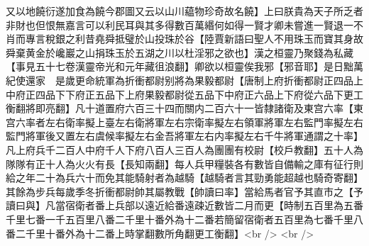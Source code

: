 又以地饒衍遂加食為饒今郡圖又云以山川藴物珍奇故名饒】上曰朕貴為天子所乏者非財也但恨無嘉言可以利民耳與其多得數百萬緡何如得一賢才卿未嘗進一賢退一不肖而專言稅銀之利昔堯舜抵璧於山投珠於谷【陸賈新語曰聖人不用珠玉而寶其身故舜棄黄金於巉巖之山捐珠玉於五湖之川以杜淫邪之欲也】漢之桓靈乃聚錢為私藏【事見五十七卷漢靈帝光和元年藏徂浪翻】卿欲以桓靈俟我邪【邪音耶】是日黜萬紀使還家　是歲更命統軍為折衝都尉别將為果毅都尉【唐制上府折衝都尉正四品上中府正四品下下府正五品下上府果毅都尉從五品下中府正六品上下府從六品下更工衡翻將即亮翻】凡十道置府六百三十四而關内二百六十一皆隸諸衛及東宫六率【東宫六率者左右衛率擬上臺左右衛將軍左右宗衛率擬左右領軍將軍左右監門率擬左右監門將軍後又置左右虞候率擬左右金吾將軍左右内率擬左右千牛將軍通謂之十率】凡上府兵千二百人中府千人下府八百人三百人為團團有校尉【校戶教翻】五十人為隊隊有正十人為火火有長【長知兩翻】每人兵甲糧裝各有數皆自備輸之庫有征行則給之年二十為兵六十而免其能騎射者為越騎【越騎者言其勁勇能超越也騎奇寄翻】其餘為步兵每歲季冬折衝都尉帥其屬教戰【帥讀曰率】當給馬者官予其直市之【予讀曰與】凡當宿衛者番上兵部以遠近給番遠疎近數皆二月而更【時制五百里為五番千里七番一千五百里八番二千里十番外為十二番若簡留宿衛者五百里為七番千里八番二千里十番外為十二番上時掌翻數所角翻更工衡翻】<br />
<br />
